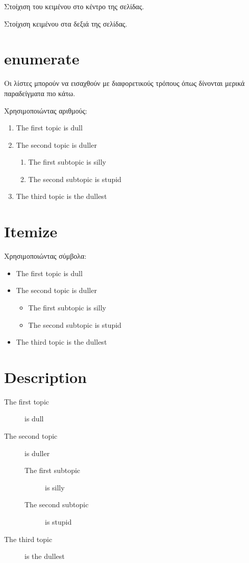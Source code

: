 \begin{center}
Στοίχιση του κειμένου στο κέντρο της σελίδας.
\end{center}

\begin{flushright}
Στοίχιση κειμένου στα δεξιά της σελίδας.
\end{flushright}


\section*{enumerate}
Οι λίστες μπορούν να εισαχθούν με διαφορετικούς τρόπους όπως δίνονται μερικά παραδείγματα πιο κάτω.

Χρησιμοποιώντας αριθμούς:
\begin{enumerate}
\item The first topic is dull
\item The second topic is duller
\begin{enumerate}
\item The first subtopic is silly
\item The second subtopic is stupid
\end{enumerate}
\item The third topic is the dullest
\end{enumerate}


\section*{Itemize}
Χρησιμοποιώντας σύμβολα:
\begin{itemize}
\item The first topic is dull
\item The second topic is duller
\begin{itemize}
\item The first subtopic is silly
\item The second subtopic is stupid
\end{itemize}
\item The third topic is the dullest
\end{itemize}

\section*{Description}
\begin{description}
\item[The first topic] is dull
\item[The second topic] is duller
\begin{description}
\item[The first subtopic] is silly
\item[The second subtopic] is stupid
\end{description}
\item[The third topic] is the dullest
\end{description}

